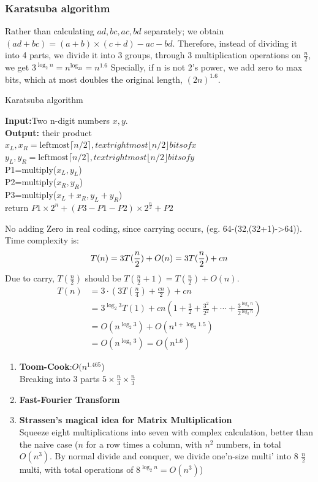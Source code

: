 \subsubsection{Karatsuba algorithm}
    Rather than calculating $ad,bc,ac,bd$ separately; we obtain $(ad+bc)=(a+b)\times(c+d)-ac-bd$.
    Therefore, instead of dividing it into 4 parts, we divide it into 3 groups, through 3 multiplication operations on $\frac{n}{2}$, we get $3^{\log_2n}=n^{\log_23}=n^{1.6}$
    Specially, if n is not 2's power, we add zero to max bits, which at most doubles the original length, $(2n)^1.6$.
    \begin{algorithm}
    \caption{Karatsuba algorithm}
    \textbf{Input:}Two n-digit numbers $x,y$. \\
    \textbf{Output:} their product\\
    $x_L,x_R=\text{leftmost} \lceil n/2\rceil ,text{rightmost} \lfloor n/2 \rfloor bits of x$ \\
    $y_L,y_R=\text{leftmost} \lceil n/2\rceil ,text{rightmost} \lfloor n/2 \rfloor bits of y$ \\
    P1=multiply($x_L,y_L$) \\
    P2=multiply($x_R,y_R$) \\
    P3=multiply($x_L+x_R,y_L+y_R$) \\
    return $P1\times 2^n+(P3-P1-P2)\times 2^{\frac{n}{2}}+P2$
    \end{algorithm}
    No adding Zero in real coding, since carrying occurs, (eg. 64-(32,(32+1)->64)).
    Time complexity is:
    \[
        T(n)=3T(\frac{n}{2})+O(n)= 3T(\frac{n}{2})+cn\\
        \]
    Due to carry, $T(\frac{n}{2})$ should be $T(\frac{n}{2}+1)=T(\frac{n}{2})+O(n)$.
\[  \begin{aligned}
    T(n)&=3\cdot(3T(\frac{n}{4})+\frac{cn}{2})+cn \\
    &=3^{\log_2 3}T(1)+cn(1+\frac{3}{2}+\frac{3^2}{2^2}+\cdots+\frac{3^{\log_2n}}{2^{\log_2n}})\\
    &=O(n^{\log_2 3})+O(n^{1+\log_2 1.5})\\
    &=O(n^{\log_2 3})=O(n^{1.6}) 
    \end{aligned}
    \]

    \begin{enumerate}
        \item \textbf{Toom-Cook}:$O(n^{1.465}$)\\
        Breaking into 3 parts $5\times\frac{n}{3}\times\frac{n}{3}$
        \item \textbf{Fast-Fourier Transform} 
        \item \textbf{Strassen's magical idea for Matrix Multiplication} \\
        Squeeze eight multiplications into seven with complex calculation, better than the naive case ($n$ for a row times a column, with $n^2$ numbers, in total $O(n^3)$. By normal divide and conquer, we divide one'n-size multi' into 8 $\frac{n}{2}$ multi, with total operations of $8^{\log_2n}=O(n^3)$)
    \end{enumerate}
    


